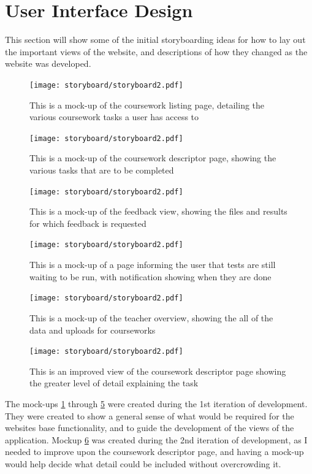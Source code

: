 \documentclass[a4paper,11pt]{report}
\begin{document}
\section{User Interface Design}
This section will show some of the initial storyboarding ideas for how to lay out the important views of the website, and descriptions of how they changed as the website was developed.\\
\begin{figure}
\centering
\texttt{[image: storyboard/storyboard2.pdf]}
\caption{\label{fig:sb1}This is a mock-up of the coursework listing page, detailing the various coursework tasks a user has access to}
\end{figure}
\begin{figure}
\centering
\texttt{[image: storyboard/storyboard2.pdf]}
\caption{\label{fig:sb2}This is a mock-up of the coursework descriptor page, showing the various tasks that are to be completed}
\end{figure}
\begin{figure}
\centering
\texttt{[image: storyboard/storyboard2.pdf]}
\caption{\label{fig:sb3}This is a mock-up of the feedback view, showing the files and results for which feedback is requested}
\end{figure}
\begin{figure}
\centering
\texttt{[image: storyboard/storyboard2.pdf]}
\caption{\label{fig:sb4}This is a mock-up of a page informing the user that tests are still waiting to be run, with notification showing when they are done}
\end{figure}
\begin{figure}
\centering
\texttt{[image: storyboard/storyboard2.pdf]}
\caption{\label{fig:sb5}This is a mock-up of the teacher overview, showing the all of the data and uploads for courseworks}
\end{figure}
\begin{figure}
\centering
\texttt{[image: storyboard/storyboard2.pdf]}
\caption{\label{fig:sb6}This is an improved view of the coursework descriptor page showing the greater level of detail explaining the task}
\end{figure}
The mock-ups \ref{fig:sb1} through \ref{fig:sb5} were created during the 1st iteration of development. They were created to show a general sense of what would be required for the websites base functionality, and to guide the development of the views of the application. Mockup \ref{fig:sb6} was created during the 2nd iteration of development, as I needed to improve upon the coursework descriptor page, and having a mock-up would help decide what detail could be included without overcrowding it.\par
\end{document}
